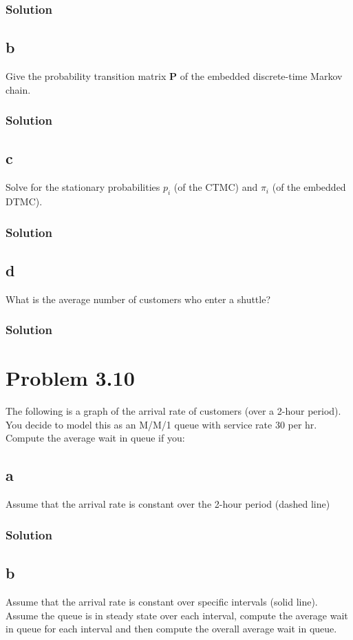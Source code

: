\documentclass[letterpaper]{amsart}
\begin{document}
 \subsubsection*{Solution}
\subsection*{b}
Give the probability transition matrix $\mathbf{P}$ of the embedded discrete-time
Markov chain.
\subsubsection*{Solution}
\subsection*{c}
Solve for the stationary probabilities $p_i$ (of the CTMC) and $\pi_i$ (of the
embedded DTMC).
\subsubsection*{Solution}
\subsection*{d}
What is the average number of customers who enter a shuttle?
\subsubsection*{Solution}

\section{Problem 3.10} %
The following is a graph of the arrival rate of customers (over a 2-hour
period). You decide to model this as an M/M/1 queue with service rate 30
per hr. Compute the average wait in queue if you:
\subsection*{a}
Assume that the arrival rate is constant over the 2-hour period (dashed
line)
\subsubsection*{Solution}
\subsection*{b}
Assume that the arrival rate is constant over specific intervals (solid
line). Assume the queue is in steady state over each interval, compute
the average wait in queue for each interval and then compute the overall
average wait in queue.
\end{document}
